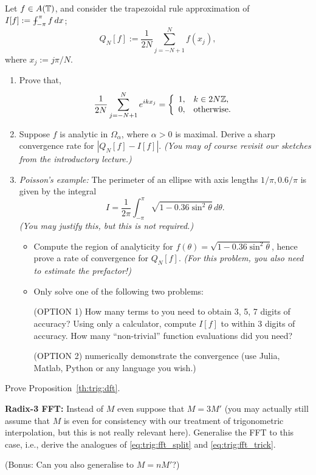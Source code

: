 \begin{exercise}
  \label{exr:trig:trapezoidal rule}
  Let $f \in A(\mathbb{T})$, and consider the trapezoidal rule approximation
  of $I[f] := \mint_{-\pi}^\pi f\,dx$;
  \[
    Q_N[f] := \frac{1}{2N} \sum_{j = -N+1}^N f(x_j),
  \]
  where $x_j := j\pi/N$.
  \begin{enumerate} \ilist
    \item Prove that,
    \[
        \frac{1}{2N} \sum_{j = -N+1}^N e^{ikx_j} =
          \left\{ \begin{array}{ll} 
              1, & k \in 2N \mathbb{Z}, \\
              0, & \text{otherwise.}
           \end{array} \right.
    \]

    \item Suppose $f$ is analytic in $\Omega_\alpha$, where $\alpha > 0$ is
    maximal. Derive a sharp convergence rate for $|Q_N[f] - I[f]|$.
    {\it (You may of course revisit our sketches from the introductory lecture.)}

    \item {\it Poisson's example: } The perimeter of an ellipse with axis
    lengths $1/\pi, 0.6/\pi$ is given by the integral
    \[
        I = \frac{1}{2\pi} \int_{-\pi}^\pi \sqrt{1 - 0.36 \sin^2\theta}\,d\theta.
    \]
    {\it (You may justify this, but this is not required.)}
    \begin{itemize}
      \item Compute the region of analyticity for $f(\theta) = \sqrt{1 - 0.36
      \sin^2\theta}$, hence prove a rate of convergence for $Q_N[f]$.
      {\it (For this problem, you also need to estimate the prefactor!)}
      \item Only solve one of the following two problems:

      (OPTION 1) How many terms to you need to obtain 3, 5, 7 digits of accuracy?
      Using only a calculator, compute $I[f]$ to within 3 digits of accuracy.
      How many ``non-trivial'' function evaluations did you need?

      (OPTION 2) numerically demonstrate the convergence (use Julia, Matlab, Python or any language you wish.) \qedhere
    \end{itemize}
  \end{enumerate}
\end{exercise}




\begin{exercise}
  Prove Proposition~\ref{th:trig:dft}.
\end{exercise}

\begin{exercise}
  {\bf Radix-3 FFT: } Instead of $M$ even suppose that $M = 3 M'$ (you may
  actually still assume that $M$ is even for consistency with our treatment of
  trigonometric interpolation, but this is not really relevant here). Generalise
  the FFT to this case, i.e., derive the analogues of \eqref{eq:trig:fft_split}
  and \eqref{eq:trig:fft_trick}.

  (Bonus: Can you also generalise to $M = n M'$?)
\end{exercise}
